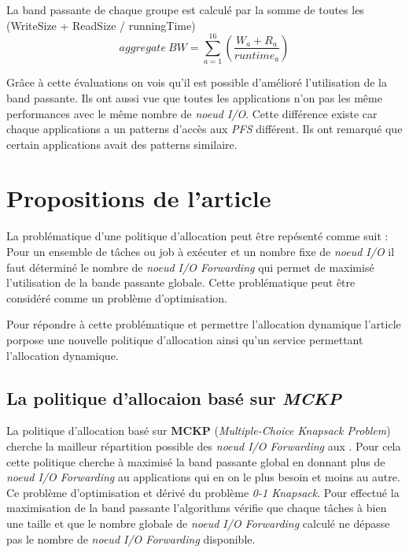 \documentclass[10pt, a4paper]{article}
\begin{document}
La band passante de chaque groupe est calculé par la somme de toutes les (WriteSize + ReadSize / runningTime)
\begin{equation*}aggregate\ BW=\sum_{a=1}^{16}\left(\frac{W_{a}+R_{a}}{runtime_{a}}\right) \tag{2}\end{equation*}

Grâce à cette évaluations on vois qu'il est possible d'amélioré l'utilisation de la band passante.
Ils ont aussi vue que toutes les applications n'on pas les même performances avec le même nombre de \emph{noeud I/O}. Cette différence existe car chaque applications a un patterns d'accès aux \emph{PFS} différent. Ils ont remarqué que certain applications avait des patterns similaire.

\section{Propositions de l'article}

La problématique d'une politique d'allocation peut être repésenté comme suit :
Pour un ensemble de tâches ou job à exécuter et un nombre fixe de \emph{noeud I/O} il faut déterminé le nombre de \emph{noeud I/O Forwarding} qui permet de maximisé l'utilisation de la bande passante globale.
Cette problématique peut être considéré comme un problème d'optimisation.

Pour répondre à cette problématique et permettre l'allocation dynamique l'article porpose une nouvelle politique d'allocation ainsi qu'un service permettant l'allocation dynamique.

\subsection{La politique d'allocaion basé sur \emph{MCKP}}

La politique d'allocation basé sur \textbf{MCKP} (\emph{Multiple-Choice Knapsack Problem}) cherche la mailleur répartition possible des \emph{noeud I/O Forwarding} aux \noeudsDeCalculs{}.
Pour cela cette politique cherche à maximisé la band passante global en donnant plus de \emph{noeud I/O Forwarding} au applications qui en on le plus besoin et moins au autre. Ce problème d'optimisation et dérivé du problème \emph{0-1 Knapsack}.
Pour effectué la maximisation de la band passante l'algorithms vérifie que chaque tâches à bien une taille et que le nombre globale de \emph{noeud I/O Forwarding} calculé ne dépasse pas le nombre de \emph{noeud I/O Forwarding} disponible.
\end{document}
